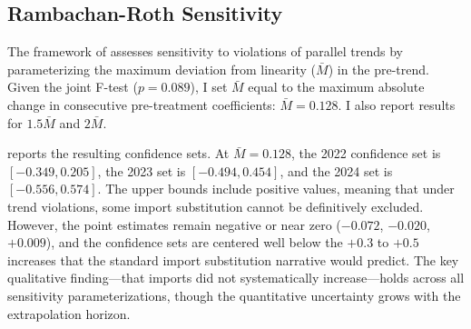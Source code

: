 \documentclass[12pt]{article}
\begin{document}
\subsection{Rambachan-Roth Sensitivity}

The framework of \citet{rambachanroth2023} assesses sensitivity to violations of parallel trends by parameterizing the maximum deviation from linearity ($\bar{M}$) in the pre-trend. Given the joint F-test ($p = 0.089$), I set $\bar{M}$ equal to the maximum absolute change in consecutive pre-treatment coefficients: $\bar{M} = 0.128$. I also report results for $1.5\bar{M}$ and $2\bar{M}$.

 reports the resulting confidence sets. At $\bar{M} = 0.128$, the 2022 confidence set is $[-0.349, 0.205]$, the 2023 set is $[-0.494, 0.454]$, and the 2024 set is $[-0.556, 0.574]$. The upper bounds include positive values, meaning that under trend violations, some import substitution cannot be definitively excluded. However, the point estimates remain negative or near zero ($-0.072$, $-0.020$, $+0.009$), and the confidence sets are centered well below the $+0.3$ to $+0.5$ increases that the standard import substitution narrative would predict. The key qualitative finding---that imports did not systematically increase---holds across all sensitivity parameterizations, though the quantitative uncertainty grows with the extrapolation horizon.
\end{document}
